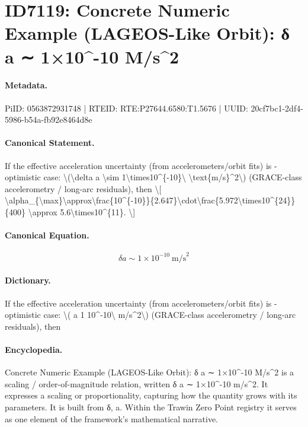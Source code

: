 \section*{ID7119: Concrete Numeric Example (LAGEOS-Like Orbit): δ a ∼ 1×10\textasciicircum{}-10 M/s\textasciicircum{}2}
\paragraph{Metadata.}
PiID: 0563872931748 | RTEID: RTE:P27644.6580:T1.5676 | UUID: 20cf7bc1-2df4-5986-b54a-fb92e8464d8e

\paragraph{Canonical Statement.}
If the effective acceleration uncertainty (from accelerometers/orbit fits) is - optimistic case: \textbackslash{}(\textbackslash{}delta a \textbackslash{}sim 1\textbackslash{}times10\textasciicircum{}\{-10\}\textbackslash{} \textbackslash{}text\{m/s\}\textasciicircum{}2\textbackslash{}) (GRACE-class accelerometry / long-arc residuals), then \textbackslash{}[ \textbackslash{}alpha\_\{\textbackslash{}max\}\textbackslash{}approx\textbackslash{}frac\{10\textasciicircum{}\{-10\}\}\{2.647\}\textbackslash{}cdot\textbackslash{}frac\{5.972\textbackslash{}times10\textasciicircum{}\{24\}\}\{400\} \textbackslash{}approx 5.6\textbackslash{}times10\textasciicircum{}\{11\}. \textbackslash{}]

\paragraph{Canonical Equation.}
\[
\delta a \sim 1\times10^{-10}\ \text{m/s}^2
\]

\paragraph{Dictionary.}
If the effective acceleration uncertainty (from accelerometers/orbit fits) is - optimistic case: \textbackslash{}( a 1 10\textasciicircum{}-10\textbackslash{} m/s\textasciicircum{}2\textbackslash{}) (GRACE-class accelerometry / long-arc residuals), then

\paragraph{Encyclopedia.}
Concrete Numeric Example (LAGEOS-Like Orbit): δ a ∼ 1×10\textasciicircum{}-10 M/s\textasciicircum{}2 is a scaling / order-of-magnitude relation, written δ a ∼ 1×10\textasciicircum{}-10 m/s\textasciicircum{}2. It expresses a scaling or proportionality, capturing how the quantity grows with its parameters. It is built from δ, a. Within the Trawin Zero Point registry it serves as one element of the framework's mathematical narrative.
